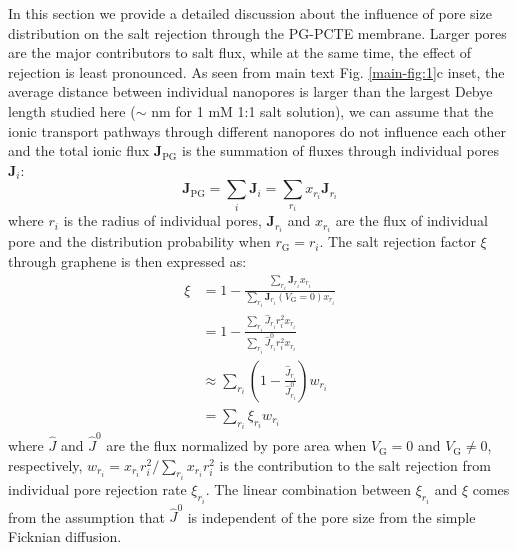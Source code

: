 \documentclass[manuscript=suppinfo,email=true, hyperref=true, keywords=false]{achemso}
\newcommand{\Fig}{Fig.}
\begin{document}
In this section we provide a detailed discussion about the
influence of pore size distribution on the salt rejection through the
PG-PCTE membrane. Larger pores are the major contributors to salt flux, while at the same time, the effect of rejection is least pronounced.
As seen from main text \Fig{} \ref{main-fig:1}c
inset, the average distance between individual nanopores is larger
than the largest Debye length studied here ($\sim{}$ \unit[30]{nm} for 1 mM 1:1
salt solution), we can assume that the ionic transport pathways
through different nanopores do not influence each other and the total
ionic flux $\boldsymbol{J}_{\mathrm{PG}}$ is the summation of fluxes
through individual pores $\boldsymbol{J}_{i}$:
\begin{equation}
\label{eq:J-total}
\boldsymbol{J}_{\mathrm{PG}} = \sum_{i} \boldsymbol{J}_{i} = \sum_{r_{i}} x_{r_{i}} \boldsymbol{J}_{r_{i}}
\end{equation}
where $r_{i}$ is the radius of individual pores,
$\boldsymbol{J}_{r_{i}}$ and $x_{r_{i}}$ are the flux of individual
pore and the distribution probability when
$r_{\mathrm{G}} = r_{i}$. The salt rejection factor
$\xi$ through graphene is then expressed as:
\begin{equation}
  \label{eq:xi-pore}
  \begin{aligned}
    \xi &= 1 - \frac{\sum_{r_{i}} \boldsymbol{J}_{r_{i}} x_{r_{i}}}
           {\sum_{r_{i}} \boldsymbol{J}_{r_{i}}(V_{\mathrm{G}} = 0) x_{r_{i}}} \\
           &= 1 - \frac{\sum_{r_{i}} \hat{J}_{r_{i}} r_{i}^{2} x_{r_{i}}}
           {\sum_{r_{i}} \hat{J}_{r_{i}}^{0} r_{i}^{2} x_{r_{i}}} \\
           &\approx \sum_{r_{i}} \left(1 -  \frac{\hat{J}_{r_{i}}}{\hat{J}_{r_{i}}^{0}}\right) w_{r_{i}} \\
           &= \sum_{r_{i}} \xi_{r_{i}} w_{r_{i}}
  \end{aligned}
\end{equation}
where $\hat{J}$ and $\hat{J}^{0}$ are the flux normalized by pore area
when $V_{\mathrm{G}} = 0$ and $V_{\mathrm{G}} \neq 0$, respectively,
$w_{r_{i}} = x_{r_{i}} r_{i}^{2} / \sum_{r_{i}} x_{r_{i}} r_{i}^{2}$ is
the contribution to the salt rejection from individual pore rejection
rate $\xi_{r_{i}}$. The linear combination between $\xi_{r_{i}}$ and
$\xi$ comes from the assumption that $\hat{J}^{0}$ is independent of
the pore size from the simple Ficknian diffusion.
\end{document}
